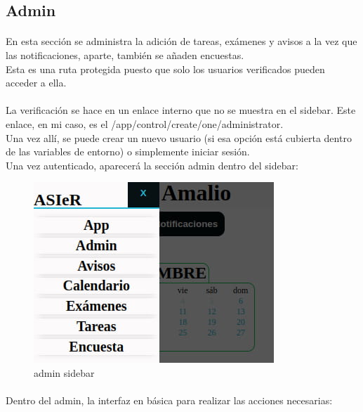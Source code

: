 \documentclass[a4paper]{article}
\begin{document}
 \subsection[/app/admin]{Admin}
 \paragraph{}
 En esta sección se administra la adición de tareas, exámenes y avisos a la vez que 
 las notificaciones, aparte, también se añaden encuestas.\\
 Esta es una ruta protegida puesto que solo los usuarios verificados pueden acceder a ella.
 \paragraph{}
 La verificación se hace en un enlace interno que no se muestra en el sidebar.
 Este enlace, en mi caso, es el /app/control/create/one/administrator.\\
 Una vez allí, se puede crear un nuevo usuario (si esa opción está cubierta dentro 
 de las variables de entorno) o simplemente iniciar sesión.\\
 Una vez autenticado, aparecerá la sección admin dentro del sidebar:
 \begin{figure}[ht]
   \includegraphics[scale=0.5]{./assets/admin-sidebar.jpg}
   \centering
   \caption{admin sidebar}
   \label{fig:admin-sidebar}
\end{figure}
\newpage
\paragraph{}
Dentro del admin, la interfaz en básica para realizar las acciones necesarias:
\end{document}
